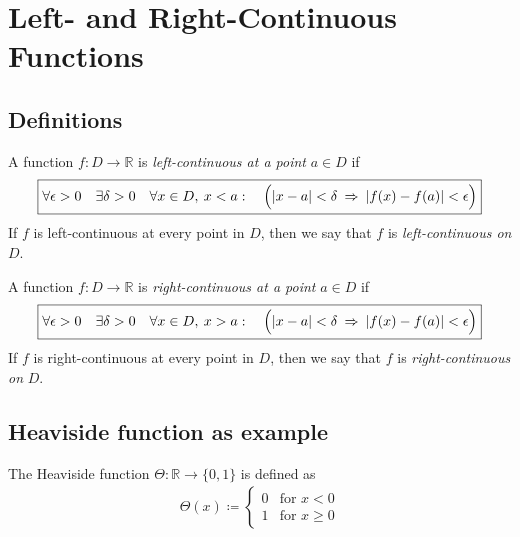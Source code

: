 \section{Left- and Right-Continuous Functions}


\subsection{Definitions}

\begin{definition}
    A function $f : D \to \mathbb{R}$ is \textit{left-continuous at a point} $a \in D$ if
    \begin{align*}
    \boxed{
        \forall \epsilon > 0 \quad \exists \delta > 0
        \quad \forall x \in D, \: x < a: \quad
        \Bigl(|x - a| < \delta \: \implies \: |f(x) - f(a)| < \epsilon \Bigr)
    }
    \end{align*}
    If $f$ is left-continuous at every point in $D$, then we say that $f$ is \textit{left-continuous on} $D$.
\end{definition}

\begin{definition}
    A function $f : D \to \mathbb{R}$ is \textit{right-continuous at a point} $a \in D$ if
    \begin{align*}
    \boxed{
        \forall \epsilon > 0 \quad \exists \delta > 0
        \quad \forall x \in D, \: x > a: \quad
        \Bigl(|x - a| < \delta \: \implies \: |f(x) - f(a)| < \epsilon \Bigr)
    }
    \end{align*}
    If $f$ is right-continuous at every point in $D$, then we say that $f$ is \textit{right-continuous on} $D$.
\end{definition}




\subsection{Heaviside function as example}

\begin{definition}
    The Heaviside function $\Theta : \mathbb{R} \to \{0, 1\}$ is defined as
    \begin{align*}
        \Theta(x) \coloneqq \begin{cases} 
            0 & \text{for } x < 0 \\
            1 & \text{for } x \geq 0
        \end{cases}
    \end{align*}
\end{definition}


